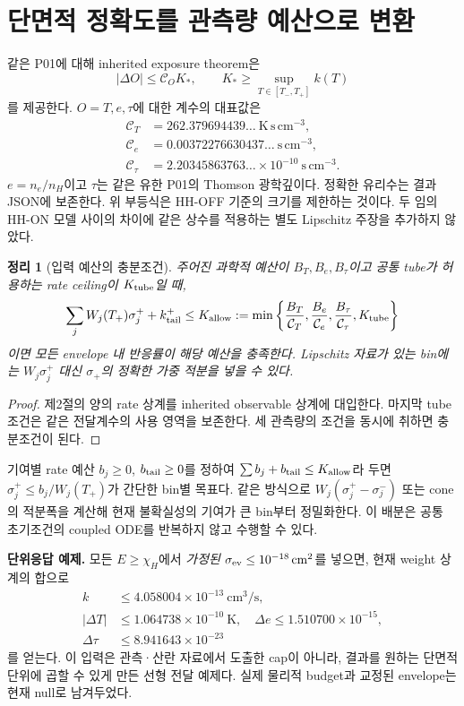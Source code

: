 \documentclass[11pt,a4paper]{article}
\newcommand{\sig}{\sigma_{\rm ev}}\newcommand{\cm}{\mathrm{CM}}\newcommand{\lab}{\mathrm{lab}}\newcommand{\hh}{\mathrm{HH}}
\newtheorem{theorem}{정리}[section]
\begin{document}
\section{단면적 정확도를 관측량 예산으로 변환}
같은 P01에 대해 inherited exposure theorem은
\begin{equation}
|\Delta O|\le\mathcal C_O K_*,\qquad K_*\ge\sup_{T\in[T_-,T_+]}k(T)
\end{equation}
를 제공한다. $O=T,e,\tau$에 대한 계수의 대표값은
\begin{align}
\mathcal C_T&=262.379694439\ldots\ \mathrm{K\,s\,cm^{-3}},\\
\mathcal C_e&=0.00372276630437\ldots\ \mathrm{s\,cm^{-3}},\\
\mathcal C_\tau&=2.20345863763\ldots\times10^{-10}\ \mathrm{s\,cm^{-3}}.
\end{align}
$e=n_e/n_H$이고 $\tau$는 같은 유한 P01의 Thomson 광학깊이다. 정확한 유리수는 결과 JSON에 보존한다. 위 부등식은 HH-OFF 기준의 크기를 제한하는 것이다. 두 임의 HH-ON 모델 사이의 차이에 같은 상수를 적용하는 별도 Lipschitz 주장을 추가하지 않았다.

\begin{theorem}[입력 예산의 충분조건]
주어진 과학적 예산이 $B_T,B_e,B_\tau$이고 공통 tube가 허용하는 rate ceiling이 $K_{\rm tube}$일 때,
\begin{equation}
\sum_j W_j(T_+)\sigma_j^++k_{\rm tail}^+
\le K_{\rm allow}:=\min\left\{
\frac{B_T}{\mathcal C_T},\frac{B_e}{\mathcal C_e},
\frac{B_\tau}{\mathcal C_\tau},K_{\rm tube}\right\}
\end{equation}
이면 모든 envelope 내 반응률이 해당 예산을 충족한다. Lipschitz 자료가 있는 bin에는 $W_j\sigma_j^+$ 대신 $\sigma_+$의 정확한 가중 적분을 넣을 수 있다.
\end{theorem}
\begin{proof}
제2절의 양의 rate 상계를 inherited observable 상계에 대입한다. 마지막 tube 조건은 같은 전달계수의 사용 영역을 보존한다. 세 관측량의 조건을 동시에 취하면 충분조건이 된다.
\end{proof}

기여별 rate 예산 $b_j\ge0$, $b_{\rm tail}\ge0$를 정하여 $\sum b_j+b_{\rm tail}\le K_{\rm allow}$라 두면 $\sigma_j^+\le b_j/W_j(T_+)$가 간단한 bin별 목표다. 같은 방식으로 $W_j(\sigma_j^+-\sigma_j^-)$ 또는 cone의 적분폭을 계산해 현재 불확실성의 기여가 큰 bin부터 정밀화한다. 이 배분은 공통 초기조건의 coupled ODE를 반복하지 않고 수행할 수 있다.

\textbf{단위응답 예제.} 모든 $E\ge\chi_H$에서 \emph{가정된} $\sig\le10^{-18}\,\mathrm{cm^2}$를 넣으면, 현재 weight 상계의 합으로
\begin{align}
k&\le4.058004\times10^{-13}\ \mathrm{cm^3/s},\\
|\Delta T|&\le1.064738\times10^{-10}\ \mathrm K,\quad
\Delta e\le1.510700\times10^{-15},\\
\Delta\tau&\le8.941643\times10^{-23}
\end{align}
를 얻는다. 이 입력은 관측·산란 자료에서 도출한 cap이 아니라, 결과를 원하는 단면적 단위에 곱할 수 있게 만든 선형 전달 예제다. 실제 물리적 budget과 교정된 envelope는 현재 null로 남겨두었다.
\end{document}
